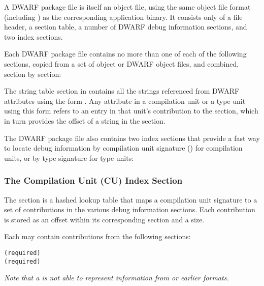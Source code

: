 A DWARF package file is itself an object file, using the
same object file format (including \byteorder) as the
corresponding application binary. It consists only of a file
header, a section table, a number of DWARF debug information
sections, and two index sections.

Each DWARF package file contains no more than one of each of the
following sections, copied from a set of object or DWARF object
files, and combined, section by section:
\begin{alltt}
    \dotdebuginfodwo
    \dotdebugabbrevdwo
    \dotdebuglinedwo
    \dotdebuglocdwo
    \dotdebugstroffsetsdwo
    \dotdebugstrdwo
    \dotdebugmacrodwo
\end{alltt}

The string table section in \dotdebugstrdwo{} contains all the
strings referenced from DWARF attributes using the form
\DWFORMstrx. Any attribute in a compilation unit or a type
unit using this form refers to an entry in that unit's
contribution to the \dotdebugstroffsetsdwo{} section, which in turn
provides the offset of a string in the \dotdebugstrdwo{}
section.

The DWARF package file also contains two index sections that
provide a fast way to locate debug information by compilation
unit signature (\DWATdwoid) for compilation units, or by type
signature for type units:
\begin{alltt}
    \dotdebugcuindex
    \dotdebugtuindex
\end{alltt}

\subsubsection{The Compilation Unit (CU) Index Section}
The \dotdebugcuindex{} section is a hashed lookup table that maps a
compilation unit signature to a set of contributions in the
various debug information sections. Each contribution is stored
as an offset within its corresponding section and a size.

Each \compunitset{} may contain contributions from the
following sections:
\begin{alltt}
    \dotdebuginfodwo{} (required)
    \dotdebugabbrevdwo{} (required)
    \dotdebuglinedwo
    \dotdebuglocdwo
    \dotdebugstroffsetsdwo
    \dotdebugmacrodwo
\end{alltt}

\textit{Note that a \compunitset{} is not able to represent \dotdebugmacinfo{}
information from \DWARFVersionIV{} or earlier formats.}

